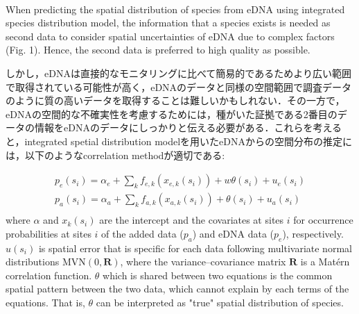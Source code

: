 \documentclass[12pt]{article}
\begin{document}
\begin{linenumbers}
\\
When predicting the spatial distribution of species from eDNA using integrated species distribution model, the information that a species exists is needed as second data to consider spatial uncertainties of eDNA due to complex factors (Fig. 1). Hence, the second data is preferred to high quality as possible. 

しかし，eDNAは直接的なモニタリングに比べて簡易的であるためより広い範囲で取得されている可能性が高く，eDNAのデータと同様の空間範囲で調査データのように質の高いデータを取得することは難しいかもしれない．その一方で，eDNAの空間的な不確実性を考慮するためには，種がいた証拠である2番目のデータの情報をeDNAのデータにしっかりと伝える必要がある．これらを考えると，integrated spetial distribution modelを用いたeDNAからの空間分布の推定には，以下のようなcorrelation methodが適切である: 

\begin{equation}
\begin{array}{ll}
p_{e}(s_{i}) = \alpha_{e} + \sum_{k}f_{e, k}(x_{e, k}(s_{i})) + w \theta(s_{i}) + u_{e}(s_{i})\\
p_{a}(s_{i}) = \alpha_{a} + \sum_{k}f_{a, k}(x_{a, k}(s_{i})) + \theta(s_{i}) + u_{a}(s_{i})\\
\end{array}
\end{equation}
where $\alpha$ and $x_{k}(s_{i})$ are the intercept and the covariates at sites $i$ for occurrence probabilities at sites $i$ of the added data ($p_{a}$) and eDNA data ($p_{e}$), respectively. $u(s_{i})$ is spatial error that is specific for each data following multivariate normal distributions $\mathrm{MVN}(0, \mathbf{R})$, where the variance--covariance matrix $\mathbf{R}$ is a Mat\'{e}rn correlation function. $\theta$ which is shared between two equations is the common spatial pattern between the two data, which cannot explain by each terms of the equations. That is, $\theta$ can be interpreted as "true" spatial distribution of species.






\end{linenumbers}
\end{document}
